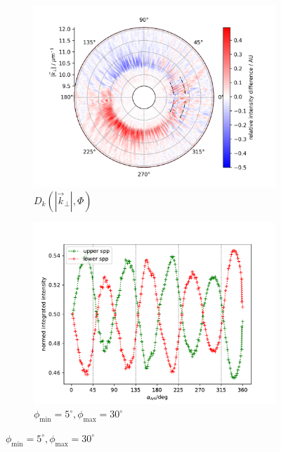 \documentclass[titlepage,  ngerman]{article}
\begin{document}
\begin{figure}
			\begin{subfigure}[b]{0.5\textwidth}
				\centering
				\includegraphics[width=\textwidth]{figures/spin_hall/diff_forw.png}
				\caption{$D_k\left(|\vec{k}_\perp|, \Phi\right)$}
				\label{fig:diff_front}
			\end{subfigure}
			\hfill
			\begin{subfigure}[b]{0.49\textwidth}
				\centering
				\includegraphics[width=\textwidth]{figures/spin_hall/intensity_forw.pdf}
				\caption{$\phi_\mathrm{min} =5^\circ, \phi_\mathrm{max}=30^\circ$}
				\label{fig:intensity_front}
			\end{subfigure}

\end{figure}
\end{document}
